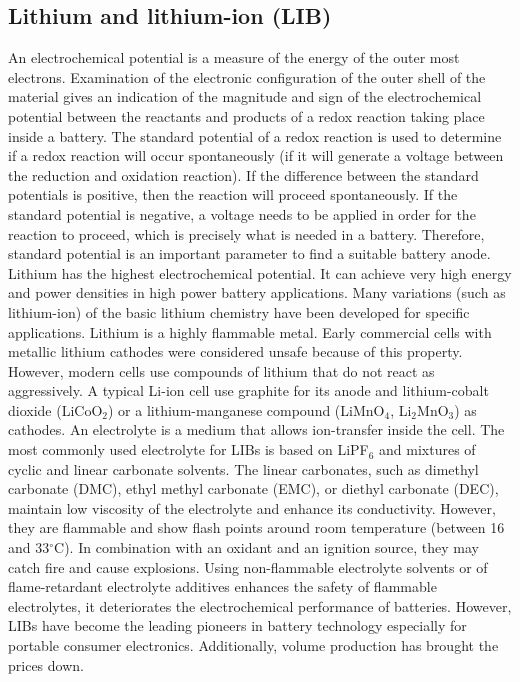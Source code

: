 \subsection{Lithium and lithium-ion (LIB)}
An electrochemical potential is a measure of the energy of the outer most electrons. Examination of the electronic configuration of the outer shell of the material gives an indication of the magnitude and sign of the electrochemical potential between the reactants and products of a redox reaction taking place inside a battery. The standard potential of a redox reaction is used to determine if a redox reaction will occur spontaneously (if it will generate a voltage between the reduction and oxidation reaction). If the difference between the standard potentials is positive, then the reaction will proceed spontaneously. If the standard potential is negative, a voltage needs to be applied in order for the reaction to proceed, which is precisely what is needed in a battery. Therefore, standard potential is an important parameter to find a suitable battery anode. Lithium has the highest electrochemical potential. It can achieve very high energy and power densities in high power battery applications. Many variations (such as lithium-ion) of the basic lithium chemistry have been developed for specific applications. Lithium is a highly flammable metal. Early commercial cells with metallic lithium cathodes were considered unsafe because of this property. However, modern cells use compounds of lithium that do not react as aggressively. A typical Li-ion cell use graphite for its anode and lithium-cobalt dioxide (LiCoO$_2$) or a lithium-manganese compound (LiMnO$_4$, Li$_2$MnO$_3$) as cathodes. An electrolyte is a medium that allows ion-transfer inside the cell. The most commonly used electrolyte for LIBs is based on LiPF$_6$ and mixtures of cyclic and linear carbonate solvents. The linear carbonates, such as dimethyl carbonate (DMC), ethyl methyl carbonate (EMC), or diethyl carbonate (DEC), maintain low viscosity of the electrolyte and enhance its conductivity. However, they are flammable and show flash points around room temperature (between 16 and 33$^{\circ}$C). In combination with an oxidant and an ignition source, they may catch fire and cause explosions. Using non-flammable electrolyte solvents or of flame-retardant electrolyte additives enhances the safety of flammable electrolytes, it deteriorates the electrochemical performance of batteries. 
However, LIBs have become the leading pioneers in battery technology especially for portable consumer electronics. Additionally, volume production has brought the prices down.
